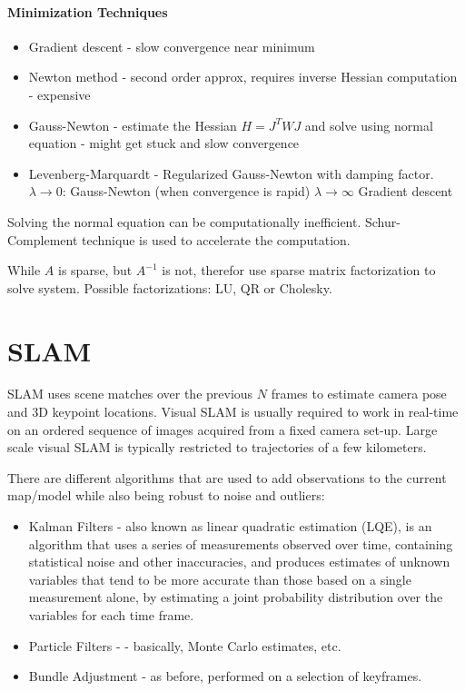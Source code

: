 \paragraph{Minimization Techniques}

\begin{itemize}
\item Gradient descent - slow convergence near minimum
\item Newton method - second order approx, requires inverse Hessian computation - expensive
\item Gauss-Newton - estimate the Hessian $H = J^TWJ$ and solve using normal equation - might get stuck and slow convergence 
\item Levenberg-Marquardt - Regularized Gauss-Newton with damping factor. 
$\lambda \rightarrow 0$: Gauss-Newton (when convergence is rapid)
$\lambda \rightarrow \infty$ Gradient descent
\end{itemize}

Solving the normal equation can be computationally inefficient. Schur-Complement technique is used to accelerate the computation. 

While $A$ is sparse, but $A^{-1}$ is not, therefor use sparse matrix factorization to solve system. Possible factorizations: LU, QR or Cholesky.

\section{SLAM}
SLAM uses scene matches over the previous $N$ frames to estimate camera pose and 3D keypoint locations. Visual SLAM is usually required to work in real-time on an ordered sequence of images acquired from a fixed camera set-up. Large scale visual SLAM is typically restricted to trajectories of a few kilometers.

There are different algorithms that are used to add observations to the current map/model while also being robust to noise and outliers: 
\begin{itemize}
\item Kalman Filters -  also known as linear quadratic estimation (LQE), is an algorithm that uses a series of measurements observed over time, containing statistical noise and other inaccuracies, and produces estimates of unknown variables that tend to be more accurate than those based on a single measurement alone, by estimating a joint probability distribution over the variables for each time frame.
\item Particle Filters -  - basically, Monte Carlo estimates, etc.
\item Bundle Adjustment - as before, performed on a selection of keyframes.
\end{itemize}

